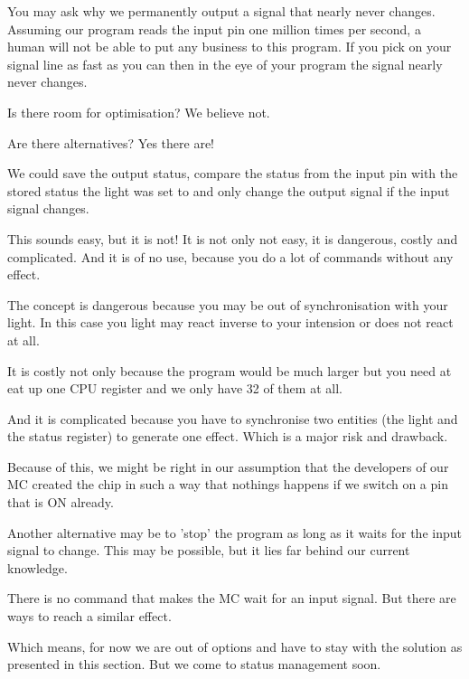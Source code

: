 You may ask why we permanently output a signal that nearly never changes. Assuming our program reads the input pin one million times per second, a human will not be able to put any business to this program. If you pick on your signal line as fast as you can then in the eye of your program the signal nearly never changes.

Is there room for optimisation? We believe not.

Are there alternatives? Yes there are!

We could save the output status, compare the status from the input pin with the stored status the light was set to and only change the output signal if the input signal changes.

This sounds easy, but it is not! It is not only not easy, it is dangerous, costly and complicated. And it is of no use, because you do a lot of commands without any effect.

The concept is dangerous because you may be out of synchronisation with your light. In this case you light may react inverse to your intension or does not react at all.

It is costly not only because the program would be much larger but you need at eat up one CPU register and we only have 32 of them at all.

And it is complicated because you have to synchronise two entities (the light and the status register) to generate one effect. Which is a major risk and drawback.

Because of this, we might be right in our assumption that the developers of our \at MC created the chip in such a way that nothings happens if we switch on a pin that is ON already.

Another alternative may be to 'stop' the program as long as it waits for the input signal to change. This may be possible, but it lies far behind our current knowledge.

There is no command that makes the MC wait for an input signal. But there are ways to reach a similar effect.

Which means, for now we are out of options and have to stay with the solution as presented in this section. But we come to status management soon.